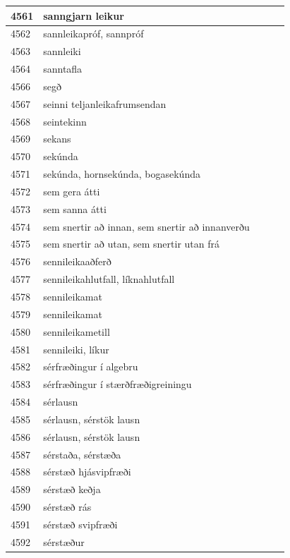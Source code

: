 \begin{longtable}{p{}|p{}|p{}|p{}|p{}}
\hline
4561 & sanngjarn leikur &  &  &  \\
\hline
4562 & sannleikapróf, sannpróf &  &  &  \\
\hline
4563 & sannleiki &  &  &  \\
\hline
4564 & sanntafla &  &  &  \\
\hline
4566 & segð &  &  &  \\
\hline
4567 & seinni teljanleikafrumsendan &  &  &  \\
\hline
4568 & seintekinn &  &  &  \\
\hline
4569 & sekans &  &  &  \\
\hline
4570 & sekúnda &  &  &  \\
\hline
4571 & sekúnda, hornsekúnda, bogasekúnda &  &  &  \\
\hline
4572 & sem gera átti &  &  &  \\
\hline
4573 & sem sanna átti &  &  &  \\
\hline
4574 & sem snertir að innan, sem snertir að innanverðu &  &  &  \\
\hline
4575 & sem snertir að utan, sem snertir utan frá &  &  &  \\
\hline
4576 & sennileikaaðferð &  &  &  \\
\hline
4577 & sennileikahlutfall, líknahlutfall &  &  &  \\
\hline
4578 & sennileikamat &  &  &  \\
\hline
4579 & sennileikamat &  &  &  \\
\hline
4580 & sennileikametill &  &  &  \\
\hline
4581 & sennileiki, líkur &  &  &  \\
\hline
4582 & sérfræðingur í algebru &  &  &  \\
\hline
4583 & sérfræðingur í stærðfræðigreiningu &  &  &  \\
\hline
4584 & sérlausn &  &  &  \\
\hline
4585 & sérlausn, sérstök lausn &  &  &  \\
\hline
4586 & sérlausn, sérstök lausn &  &  &  \\
\hline
4587 & sérstaða, sérstæða &  &  &  \\
\hline
4588 & sérstæð hjásvipfræði &  &  &  \\
\hline
4589 & sérstæð keðja &  &  &  \\
\hline
4590 & sérstæð rás &  &  &  \\
\hline
4591 & sérstæð svipfræði &  &  &  \\
\hline
4592 & sérstæður &  &  &  \\

\end{longtable}
